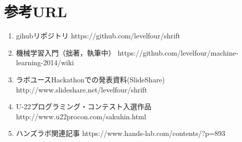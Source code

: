 \documentclass[11pt, a4paper]{jsarticle}
\begin{document}
\section{参考URL}
\begin{enumerate}
	\renewcommand{\labelenumi}{[\arabic{enumi}]}
	\item gihubリポジトリ https://github.com/levelfour/shrift
	\item 機械学習入門（拙著，執筆中） https://github.com/levelfour/machine-learning-2014/wiki
	\item ラボユースHackathonでの発表資料(SlideShare) http://www.slideshare.net/levelfour/shrift
	\item U-22プログラミング・コンテスト入選作品 http://www.u22procon.com/sakuhin.html
	\item ハンズラボ関連記事 https://www.hands-lab.com/contents/?p=893
\end{enumerate}
\end{document}

